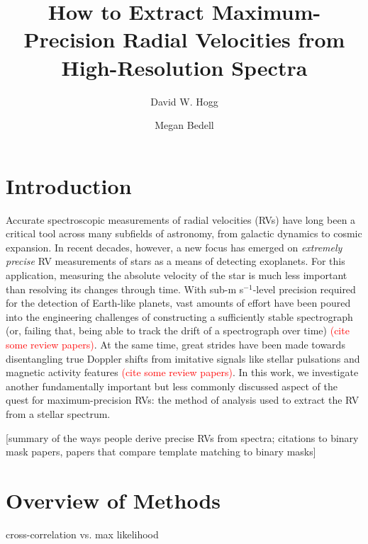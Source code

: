 \documentclass[modern]{aastex61}
\newcommand{\ms}{m s$^{-1}$}
\newcommand\todo[1]{\textcolor{red}{#1}}  %
\begin{document}
\graphicspath{ {figures/} }

\title{How to Extract Maximum-Precision Radial Velocities from High-Resolution Spectra}

\author{David W. Hogg}

\author{Megan Bedell}

\begin{abstract}

\end{abstract}

\section{Introduction}

Accurate spectroscopic measurements of radial velocities (RVs) have long been a critical tool across many subfields of astronomy, from galactic dynamics to cosmic expansion. In recent decades, however, a new focus has emerged on \textit{extremely precise} RV measurements of stars as a means of detecting exoplanets. For this application, measuring the absolute velocity of the star is much less important than resolving its changes through time. With sub-\ms-level precision required for the detection of Earth-like planets, vast amounts of effort have been poured into the engineering challenges of constructing a sufficiently stable spectrograph (or, failing that, being able to track the drift of a spectrograph over time) \todo{(cite some review papers)}. At the same time, great strides have been made towards disentangling true Doppler shifts from imitative signals like stellar pulsations and magnetic activity features \todo{(cite some review papers)}.  In this work, we investigate another fundamentally important but less commonly discussed aspect of the quest for maximum-precision RVs: the method of analysis used to extract the RV from a stellar spectrum.



[summary of the ways people derive precise RVs from spectra; citations to binary mask papers, papers that compare template matching to binary masks]

\section{Overview of Methods}

cross-correlation vs. max likelihood
\end{document}
